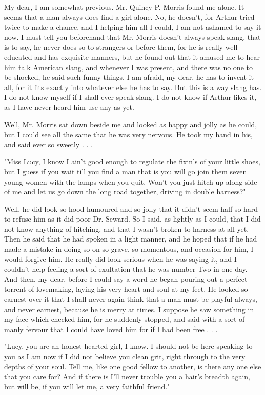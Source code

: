 My dear, I am somewhat previous. Mr. Quincy P. Morris found me alone. It seems that a man always does find a girl alone. No, he doesn't, for Arthur tried twice to make a chance, and I helping him all I could, I am not ashamed to say it now. I must tell you beforehand that Mr. Morris doesn't always speak slang, that is to say, he never does so to strangers or before them, for he is really well educated and has exquisite manners, but he found out that it amused me to hear him talk American slang, and whenever I was present, and there was no one to be shocked, he said such funny things. I am afraid, my dear, he has to invent it all, for it fits exactly into whatever else he has to say. But this is a way slang has. I do not know myself if I shall ever speak slang. I do not know if Arthur likes it, as I have never heard him use any as yet. 

Well, Mr. Morris sat down beside me and looked as happy and jolly as he could, but I could see all the same that he was very nervous. He took my hand in his, and said ever so sweetly . . . 

"Miss Lucy, I know I ain't good enough to regulate the fixin's of your little shoes, but I guess if you wait till you find a man that is you will go join them seven young women with the lamps when you quit. Won't you just hitch up along-side of me and let us go down the long road together, driving in double harness?" 

Well, he did look so hood humoured and so jolly that it didn't seem half so hard to refuse him as it did poor Dr. Seward. So I said, as lightly as I could, that I did not know anything of hitching, and that I wasn't broken to harness at all yet. Then he said that he had spoken in a light manner, and he hoped that if he had made a mistake in doing so on so grave, so momentous, and occasion for him, I would forgive him. He really did look serious when he was saying it, and I couldn't help feeling a sort of exultation that he was number Two in one day. And then, my dear, before I could say a word he began pouring out a perfect torrent of lovemaking, laying his very heart and soul at my feet. He looked so earnest over it that I shall never again think that a man must be playful always, and never earnest, because he is merry at times. I suppose he saw something in my face which checked him, for he suddenly stopped, and said with a sort of manly fervour that I could have loved him for if I had been free . . . 

"Lucy, you are an honest hearted girl, I know. I should not be here speaking to you as I am now if I did not believe you clean grit, right through to the very depths of your soul. Tell me, like one good fellow to another, is there any one else that you care for? And if there is I'll never trouble you a hair's breadth again, but will be, if you will let me, a very faithful friend." 

